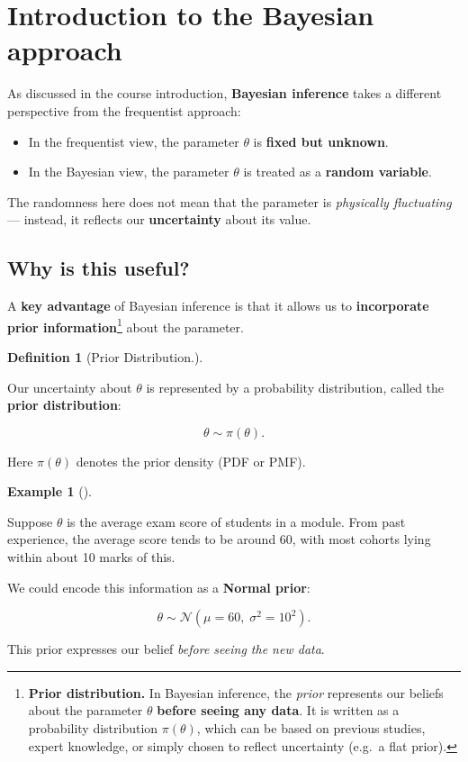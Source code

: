 \documentclass[
  letterpaper,
  DIV=11,
  numbers=noendperiod]{scrreprt}
\providecommand{\tightlist}{%
  \setlength{\itemsep}{0pt}\setlength{\parskip}{0pt}}
\theoremstyle{definition}
\newtheorem{example}{Example}[chapter]
\theoremstyle{plain}
\theoremstyle{definition}
\newtheorem{definition}{Definition}[chapter]
\theoremstyle{remark}
\begin{document}
\section{Introduction to the Bayesian
approach}\label{introduction-to-the-bayesian-approach}

As discussed in the course introduction, \textbf{Bayesian inference}
takes a different perspective from the frequentist approach:

\begin{itemize}
\tightlist
\item
  In the frequentist view, the parameter \(\theta\) is \textbf{fixed but
  unknown}.
\item
  In the Bayesian view, the parameter \(\theta\) is treated as a
  \textbf{random variable}.
\end{itemize}

The randomness here does not mean that the parameter is \emph{physically
fluctuating} --- instead, it reflects our \textbf{uncertainty} about its
value.

\subsection{Why is this useful?}\label{why-is-this-useful}

A \textbf{key advantage} of Bayesian inference is that it allows us to
\textbf{incorporate prior information}\footnote{\textbf{Prior
  distribution.} In Bayesian inference, the \emph{prior} represents our
  beliefs about the parameter \(\theta\) \textbf{before seeing any
  data}. It is written as a probability distribution \(\pi(\theta)\),
  which can be based on previous studies, expert knowledge, or simply
  chosen to reflect uncertainty (e.g.~a flat prior).} about the
parameter.

\begin{definition}[Prior
Distribution.]\protect\hypertarget{def-prior}{}\label{def-prior}

Our uncertainty about \(\theta\) is represented by a probability
distribution, called the \textbf{prior distribution}:

\[
\theta \sim \pi(\theta).
\]

Here \(\pi(\theta)\) denotes the prior density (PDF or PMF).

\end{definition}

\begin{example}[]\protect\hypertarget{exm-prior}{}\label{exm-prior}

Suppose \(\theta\) is the average exam score of students in a module.
From past experience, the average score tends to be around 60, with most
cohorts lying within about 10 marks of this.

We could encode this information as a \textbf{Normal prior}:

\[
\theta \sim \mathcal{N}(\mu=60,\;\sigma^2=10^2).
\]

This prior expresses our belief \emph{before seeing the new data}.

\end{example}
\end{document}
